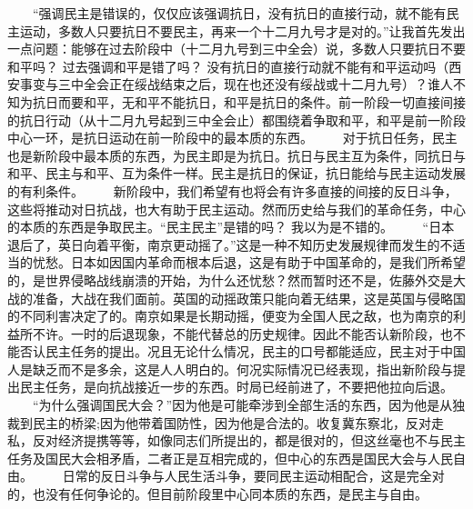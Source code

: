 \documentclass[twocolumn]{cvertbook}
\begin{document}

　　“强调民主是错误的，仅仅应该强调抗日，没有抗日的直接行动，就不能有民主运动，多数人只要抗日不要民主，再来一个十二月九号才是对的。”让我首先发出一点问题：能够在过去阶段中（十二月九号到三中全会）说，多数人只要抗日不要和平吗？ 过去强调和平是错了吗？ 没有抗日的直接行动就不能有和平运动吗（西安事变与三中全会正在绥战结束之后，现在也还没有绥战或十二月九号）？谁人不知为抗日而要和平，无和平不能抗日，和平是抗日的条件。前一阶段一切直接间接的抗日行动（从十二月九号起到三中全会止）都围绕着争取和平，和平是前一阶段中心一环，是抗日运动在前一阶段中的最本质的东西。
　　对于抗日任务，民主也是新阶段中最本质的东西，为民主即是为抗日。抗日与民主互为条件，同抗日与和平、民主与和平、互为条件一样。民主是抗日的保证，抗日能给与民主运动发展的有利条件。
　　新阶段中，我们希望有也将会有许多直接的间接的反日斗争，这些将推动对日抗战，也大有助于民主运动。然而历史给与我们的革命任务，中心的本质的东西是争取民主。“民主民主”是错的吗？ 我以为是不错的。
　　“日本退后了，英日向着平衡，南京更动摇了。”这是一种不知历史发展规律而发生的不适当的忧愁。日本如因国内革命而根本后退，这是有助于中国革命的，是我们所希望的，是世界侵略战线崩溃的开始，为什么还忧愁？然而暂时还不是，佐藤外交是大战的准备，大战在我们面前。英国的动摇政策只能向着无结果，这是英国与侵略国的不同利害决定了的。南京如果是长期动摇，便变为全国人民之敌，也为南京的利益所不许。一时的后退现象，不能代替总的历史规律。因此不能否认新阶段，也不能否认民主任务的提出。况且无论什么情况，民主的口号都能适应，民主对于中国人是缺乏而不是多余，这是人人明白的。何况实际情况已经表现，指出新阶段与提出民主任务，是向抗战接近一步的东西。时局已经前进了，不要把他拉向后退。
　　“为什么强调国民大会？”因为他是可能牵涉到全部生活的东西，因为他是从独裁到民主的桥梁;因为他带着国防性，因为他是合法的。收复冀东察北，反对走私，反对经济提携等等，如像同志们所提出的，都是很对的，但这丝毫也不与民主任务及国民大会相矛盾，二者正是互相完成的，但中心的东西是国民大会与人民自由。
　　日常的反日斗争与人民生活斗争，要同民主运动相配合，这是完全对的，也没有任何争论的。但目前阶段里中心同本质的东西，是民主与自由。

\end{document}
